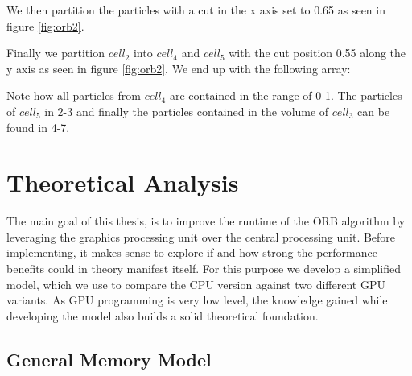\documentclass[]{article}
\begin{document}
We then partition the particles with a cut in the x axis set to 0.65 as seen in figure \ref{fig:orb2}.

\begin{figure}[H]
	\begin{center}
	\end{center}
\end{figure}

Finally we partition $cell_2$ into $cell_4$ and $cell_5$ with the cut position 0.55 along the y axis as seen in figure \ref{fig:orb2}. We end up with the following array:

\begin{figure}[H]
	\begin{center}
	\end{center}
\end{figure}

Note how all particles from $cell_4$ are contained in the range of 0-1. The particles of $cell_5$ in 2-3 and finally the particles contained in the volume of $cell_3$ can be found in 4-7.


\newpage
\section{Theoretical Analysis}

The main goal of this thesis, is to improve the runtime of the ORB algorithm by leveraging the graphics processing unit over the central processing unit. Before implementing, it makes sense to explore if and how strong the performance benefits could in theory manifest itself. For this purpose we develop a simplified model, which we use to compare the CPU version against two different GPU variants. As GPU programming is very low level, the knowledge gained while developing the model also builds a solid theoretical foundation.

\subsection{General Memory Model}\label{sec:gmm}
\end{document}
